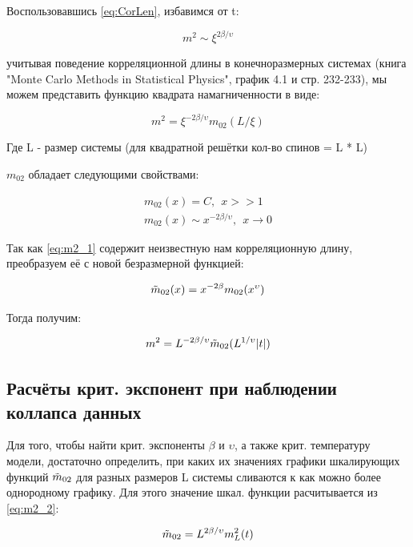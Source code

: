Воспользовавшись \eqref{eq:CorLen}, избавимся от t:

\begin{equation}
    m^{2} \sim \xi ^{2\beta/\upsilon}
\end{equation}

учитывая поведение корреляционной длины в конечноразмерных системах (книга "Monte Carlo Methods in Statistical Physics", график 4.1 и стр. 232-233)\cite{NewBar}, мы можем представить функцию квадрата намагниченности в виде:

\begin{equation}\label{eq:m2_1}
    m^{2} = \xi ^{-2\beta/\upsilon} m_{02}(L/\xi)
\end{equation}

Где L - размер системы (для квадратной решётки кол-во спинов = L * L)

$m_{02}$ обладает следующими свойствами:

\begin{align*}
    m_{02}(x) = C,\ \ x >> 1 \\
    m_{02}(x) \sim x^{-2\beta/\upsilon},\ \ x \rightarrow 0
\end{align*}

Так как \eqref{eq:m2_1} содержит неизвестную нам корреляционную длину, преобразуем её с новой безразмерной функцией:

\begin{equation}
    \Tilde{m}_{02}(x) = x^{-2\beta} m_{02}(x^{\upsilon})
\end{equation}

Тогда получим:

\begin{equation}\label{eq:m2_2}
    m^{2} = L^{-2\beta/\upsilon} \Tilde{m}_{02}(L^{1/\upsilon}|t|)
\end{equation}

\subsection{Расчёты крит. экспонент при наблюдении коллапса данных}
Для того, чтобы найти крит. экспоненты $\beta$ и $\upsilon$, а также крит. температуру модели, достаточно определить, при каких их значениях графики шкалирующих функций $\Tilde{m}_{02}$ для разных размеров L системы сливаются к как можно более однородному графику. Для этого значение шкал. функции расчитывается из \eqref{eq:m2_2}:

\begin{equation}\label{eq:m02}
    \Tilde{m}_{02} = L^{2\beta/\upsilon} m_{L}^{2}(t)
\end{equation}

